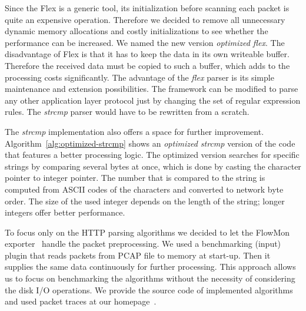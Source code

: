 Since the Flex is a generic tool, its initialization before scanning each packet is quite an expensive operation. Therefore we decided to remove all unnecessary dynamic memory allocations and costly initializations to see whether the performance can be increased. We named the new version \emph{optimized flex}. The disadvantage of Flex is that it has to keep the data in its own writeable buffer. Therefore the received data must be copied to such a buffer, which adds to the processing costs significantly. The advantage of the \emph{flex} parser is its simple maintenance and extension possibilities. The framework can be modified to parse any other application layer protocol just by changing the set of regular expression rules. The \emph{strcmp} parser would have to be rewritten from a scratch.

The \emph{strcmp} implementation also offers a space for further improvement. Algorithm~\ref{alg:optimized-strcmp} shows an \emph{optimized strcmp} version of the code that features a better processing logic. The optimized version searches for specific strings by comparing several bytes at once, which is done by casting the character pointer to integer pointer. The number that is compared to the string is computed from ASCII codes of the characters and converted to network byte order. The size of the used integer depends on the length of the string; longer integers offer better performance.

To focus only on the HTTP parsing algorithms we decided to let the FlowMon exporter~\cite{FlowmonNetworks--Flowmon} handle the packet preprocessing. We used a  benchmarking (input) plugin that reads packets from PCAP file to memory at start-up. Then it supplies the same data continuously for further processing. This approach allows us to focus on benchmarking the algorithms without the necessity of considering the disk I/O operations. We provide the source code of implemented algorithms and used packet traces at our homepage~\cite{Sima-2013-FlowMon}.

